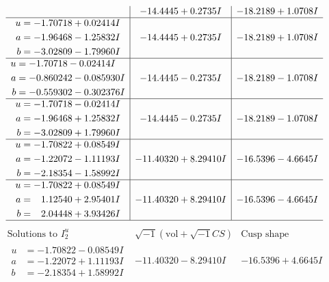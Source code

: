 \documentclass[1p]{elsarticle_modified}
\theoremstyle{definition}
\newcommand{\I}{\sqrt{-1}}
\begin{document}
$$\begin{array}{c|c|c}
 & -14.4445 + 0.2735 I & -18.2189 + 1.0708 I \\ \hline\begin{aligned}
u &= -1.70718 + 0.02414 I \\
a &= -1.96468 - 1.25832 I \\
b &= -3.02809 - 1.79960 I\end{aligned}
 & -14.4445 + 0.2735 I & -18.2189 + 1.0708 I \\ \hline\begin{aligned}
u &= -1.70718 - 0.02414 I \\
a &= -0.860242 - 0.085930 I \\
b &= -0.559302 - 0.302376 I\end{aligned}
 & -14.4445 - 0.2735 I & -18.2189 - 1.0708 I \\ \hline\begin{aligned}
u &= -1.70718 - 0.02414 I \\
a &= -1.96468 + 1.25832 I \\
b &= -3.02809 + 1.79960 I\end{aligned}
 & -14.4445 - 0.2735 I & -18.2189 - 1.0708 I \\ \hline\begin{aligned}
u &= -1.70822 + 0.08549 I \\
a &= -1.22072 - 1.11193 I \\
b &= -2.18354 - 1.58992 I\end{aligned}
 & -11.40320 + 8.29410 I & -16.5396 - 4.6645 I \\ \hline\begin{aligned}
u &= -1.70822 + 0.08549 I \\
a &= \phantom{-}1.12540 + 2.95401 I \\
b &= \phantom{-}2.04448 + 3.93426 I\end{aligned}
 & -11.40320 + 8.29410 I & -16.5396 - 4.6645 I\\
 \hline 
 \end{array}$$\newpage$$\begin{array}{c|c|c}  
\text{Solutions to }I^u_{2}& \I (\text{vol} + \sqrt{-1}CS) & \text{Cusp shape}\\
 \hline 
\begin{aligned}
u &= -1.70822 - 0.08549 I \\
a &= -1.22072 + 1.11193 I \\
b &= -2.18354 + 1.58992 I\end{aligned}
 & -11.40320 - 8.29410 I & -16.5396 + 4.6645 I \\ \hline\begin{aligned}

\end{aligned}
\end{array}$$
\end{document}
